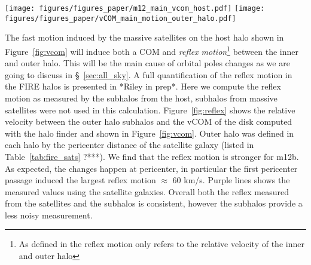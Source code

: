 \documentclass{aastex63}
\begin{document}
\begin{figure*}[h]
    \centering
    \texttt{[image: figures/figures\_paper/m12\_main\_vcom\_host.pdf]}
    \texttt{[image: figures/figures\_paper/vCOM\_main\_motion\_outer\_halo.pdf]}

    \caption{Satellite's galactocentric position (top panel) and velocity (middle panel) as a function of time. The magnitude of the host's velocity plotted as a function of time. The host's velocity decreases by 60km/s after the satellite's first pericenter, and then increase 80km/s until the 2nd pericenter. Finally the velocity settles after the merger at 140 km/s. Such rapid motions happen in less than 2 Gyrs. (How does it compare with the dynamical times of the halo). Reflex motion: Relative velocity between the inner and outer halo. The outer halo velocity is measured using the subhalos (black) and satellites galaxies (purple) that are beyond the pericenter distance of the massive subhalo. The inner halo velocity is shown in Figure~\ref{fig:vcom} and measured by the halo finder}
    \label{fig:vcom}
\end{figure*}



The fast motion induced by the massive satellites on the host halo shown in Figure~\ref{fig:vcom} will induce both a COM and \textit{reflex motion}\footnote{As defined in \cite{Peterson20} the reflex motion only refers to the relative velocity of the inner and outer halo} between the inner and outer halo. This will be the main cause of orbital poles changes as we are going to discuss in \S~\ref{sec:all_sky}. A full quantification of the reflex motion in the FIRE halos is presented in *Riley in prep*. Here we compute the reflex motion as measured by the subhalos from the host, subhalos from massive satellites were not used in this calculation. Figure~\ref{fig:reflex} shows the relative velocity between the outer halo subhalos and the vCOM of the disk computed with the halo finder and shown in Figure~\ref{fig:vcom}. Outer halo was defined in each halo by the pericenter distance of the satellite galaxy (listed in Table~\ref{tab:fire_sats} ?***). We find that the reflex motion is stronger for m12b. As expected, the changes happen at pericenter, in particular the first pericenter passage induced the largest reflex motion $\approx$ 60 km/s. Purple lines shows the measured values using the satellite galaxies. Overall both the reflex measured from the satellites and the subhalos is consistent, however the subhalos provide a less noisy measurement. 
\end{document}
